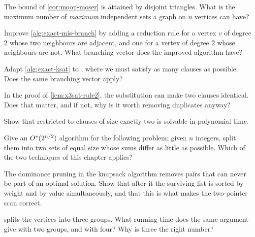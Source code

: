 \begin{exercise}
The bound of \cref{cor:moon-moser} is attained by disjoint triangles. What is
the maximum number of \emph{maximum} independent sets a graph on $n$ vertices
can have?
\end{exercise}

\begin{exercise}
Improve \cref{alg:exact-mis-branch} by adding a reduction rule for a vertex $v$
of degree $2$ whose two neighbours are adjacent, and one for a vertex of degree
$2$ whose neighbours are not. What branching vector does the improved algorithm
have?
\end{exercise}

\begin{exercise}
Adapt \cref{alg:exact-ksat} to , where we must satisfy as many
clauses as possible. Does the same branching vector apply?
\end{exercise}

\begin{exercise}
In the proof of \cref{lem:x3sat-rule2}, the substitution can make two clauses
identical. Does that matter, and if not, why is it worth removing duplicates
anyway?
\end{exercise}

\begin{exercise}
Show that  restricted to clauses of size exactly
two is solvable in polynomial time.
\end{exercise}

\begin{exercise}
Give an $O^{*}(2^{n/2})$ algorithm for the following problem: given $n$
integers, split them into two sets of equal size whose sums differ as little as
possible. Which of the two techniques of this chapter applies?
\end{exercise}

\begin{exercise}
The dominance pruning in the knapsack algorithm removes pairs that can never be
part of an optimal solution. Show that after it the surviving list is sorted by
weight and by value simultaneously, and that this is what makes the two-pointer
scan correct.
\end{exercise}

\begin{exercise}
 splits the vertices into three groups. What running time
does the same argument give with two groups, and with four? Why is three the
right number?
\end{exercise}
